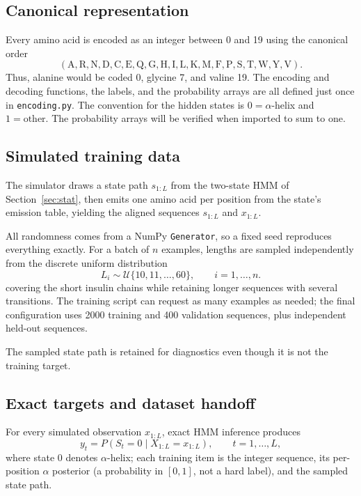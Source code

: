 \documentclass[12pt]{article}
\begin{document}
\subsection{Canonical representation}

Every amino acid is encoded as an integer between 0 and 19 using the canonical order
\begin{equation}
(\mathrm{A,R,N,D,C,E,Q,G,H,I,L,K,M,F,P,S,T,W,Y,V}).
\end{equation}
Thus, alanine would be coded 0, glycine 7, and valine 19. The encoding and decoding functions, the labels, and the probability arrays are all defined just once in \texttt{encoding.py}. The convention for the hidden states is $0=\alpha$-helix and $1=\text{other}$. The probability arrays will be verified when imported to sum to one.

\subsection{Simulated training data}

The simulator draws a state path $s_{1:L}$ from the two-state HMM of
Section~\ref{sec:stat}, then emits one amino acid per position from the
state's emission table, yielding the aligned sequences $s_{1:L}$ and
$x_{1:L}$.

All randomness comes from a NumPy \texttt{Generator}, so a fixed seed
reproduces everything exactly. For a
batch of $n$ examples, lengths are sampled independently from the discrete uniform
distribution
\begin{equation}
L_i \sim \mathcal{U}\{10,11,\ldots,60\}, \qquad i=1,\ldots,n.
\end{equation}
covering the short insulin chains while retaining longer sequences with
several transitions. The training script can request as many examples as
needed; the final configuration uses 2000 training and 400 validation sequences,
plus independent held-out sequences.

The sampled state path is retained for diagnostics even though it is not
the training target.

\subsection{Exact targets and dataset handoff}

For every simulated observation $x_{1:L}$, exact HMM inference produces
\begin{equation}
y_t = P(S_t=0\mid X_{1:L}=x_{1:L}), \qquad t=1,\ldots,L,
\end{equation}
where state 0 denotes $\alpha$-helix; each training item is the integer sequence,
its per-position $\alpha$ posterior (a probability in $[0,1]$, not a hard
label), and the sampled state path.
\end{document}

